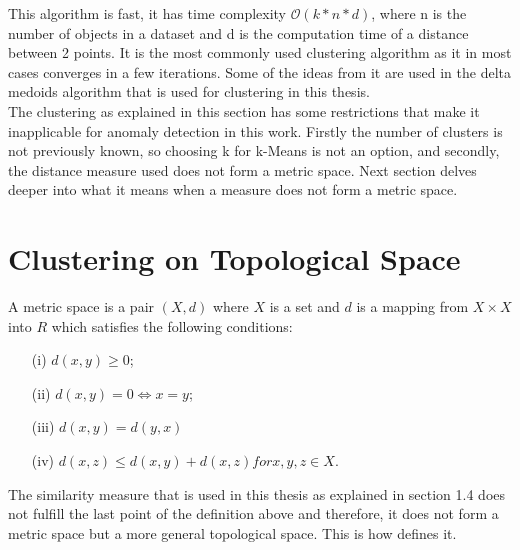 \documentclass[thesis=B,english]{FITthesis}[2012/10/20]
\begin{document}
This algorithm is fast, it has time complexity $\mathcal{O}(k*n*d)$, where n is the number of objects in a dataset and d is the computation time of a distance between 2 points.
It is the most commonly used clustering algorithm as it in most cases converges in a few iterations.
Some of the ideas from it are used in the delta medoids algorithm that is used for clustering in this thesis. \\
                                                                                  
The clustering as explained in this section has some restrictions that make it inapplicable for anomaly detection in this work.
Firstly the number of clusters is not previously known, so choosing k for k-Means is not an option, and secondly, the distance measure used does not form a metric space.
Next section delves deeper into what it means when a measure does not form a metric space.
                                                                                  
\section{Clustering on Topological Space}

A metric space is a pair $(X, d)$ where $X$ is a set and $d$ is a mapping from $X \times X$ into $R$ which satisfies the following conditions:
\begin{enumerate}                                                                 
    \item [(i)] $d(x, y) \geq 0$;                                                 
    \item [(ii)] $d(x, y) = 0 \iff x = y$;                                        
    \item [(iii)] $d(x, y) = d(y, x)$                                             
    \item [(iv)] $d(x, z) \leq d(x, y) + d(x, z) for x, y, z \in X$.              
\end{enumerate}                                                                   
                                                                                  
The similarity measure that is used in this thesis as explained in section 1.4  does not fulfill the last point of the definition above and therefore, it does not form a metric space but a more general topological space. This is how \cite{stahl2014introduction} defines it. \\
\end{document}
